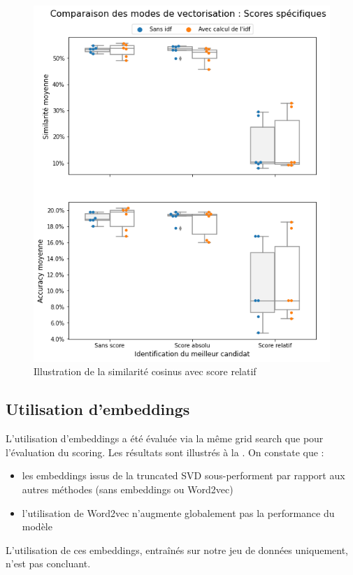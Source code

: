             \begin{figure}[htbp]
                \begin{center}
                \includegraphics[width=0.6\linewidth]{img/tuning_score.png}
                \end{center}
                \caption{Illustration de la similarité cosinus avec score relatif}
                \label{fig:tuning_score}
            \end{figure}

            \subsection{Utilisation d'embeddings}

            L'utilisation d'embeddings a été évaluée via la même grid search que pour l'évaluation du scoring.
            Les résultats sont illustrés à la .
            On constate que : 
            \begin{itemize}
                \item les embeddings issus de la truncated SVD sous-performent par rapport aux autres méthodes (sans embeddings ou Word2vec)
                \item l'utilisation de Word2vec n'augmente globalement pas la performance du modèle
            \end{itemize}
            L'utilisation de ces embeddings, entraînés sur notre jeu de données uniquement, n'est pas concluant.

